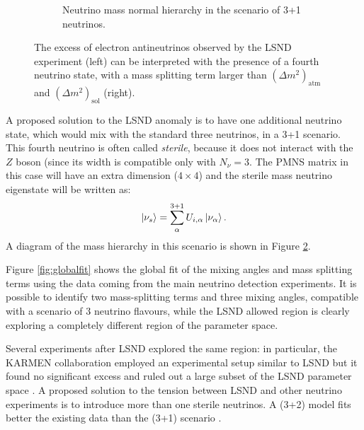 \begin{figure}[htbp]
\begin{subfigure}{0.45\textwidth}
\begin{center}
        \caption{Neutrino mass normal hierarchy in the scenario of 3+1 neutrinos.}\label{fig:masslsnd}
    \end{center}
  \end{subfigure}
    \caption{The excess of electron antineutrinos observed by the LSND experiment (left) can be interpreted with the presence of a fourth neutrino state, with a mass splitting term larger than $(\Delta m^2)_{\mathrm{atm}}$ and $(\Delta m^2)_{\mathrm{sol}}$ (right).}
\end{figure}

A proposed solution to the LSND anomaly is to have one additional neutrino state, which would mix with the standard three neutrinos, in a 3+1 scenario. This fourth neutrino is often called \emph{sterile}, because it does not interact with the $Z$ boson (since its width is compatible only with $N_{\nu}=3$. The PMNS matrix in this case will have an extra dimension ($4\times4$) and the sterile mass neutrino eigenstate will be written as:
\begin{equation}
    \ket{\nu_s}=\sum^{3+1}_{\alpha}U_{i,\alpha}\ket{\nu_{\alpha}}.
\end{equation}
A diagram of the mass hierarchy in this scenario is shown in Figure \ref{fig:masslsnd}.

Figure \ref{fig:globalfit} shows the global fit of the mixing angles and mass splitting terms using the data coming from the main neutrino detection experiments. It is possible to identify two mass-splitting terms and three mixing angles, compatible with a scenario of 3 neutrino flavours, while the LSND allowed region is clearly exploring a completely different region of the parameter space. 

Several experiments after LSND explored the same region: in particular, the KARMEN collaboration employed an experimental setup similar to LSND but it found no significant excess and ruled out a large subset of the LSND parameter space \cite{Eitel:2000by}. A proposed solution to the tension between LSND and other neutrino experiments is to introduce more than one sterile neutrinos. A (3+2) model fits better the existing data than the (3+1) scenario \cite{Sorel:2003hf}.


